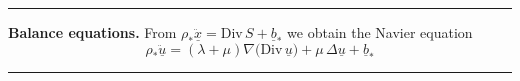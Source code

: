 \rule{0.31\textwidth}{0.2pt}
\smallskip

\textbf{Balance equations.} From $\rho_*\ddot{\underline{x}}=\text{Div}\,S+\underline{b}_*$ we obtain the Navier equation
\begin{equation*}
\boxed{\rho_*\ddot{\underline{u}}=(\lambda+\mu)\nabla\big(\text{Div}\,\underline{u}\big)+\mu\,\Delta \underline{u}+\underline{b}_*}
\end{equation*}

\rule{0.31\textwidth}{1pt}









